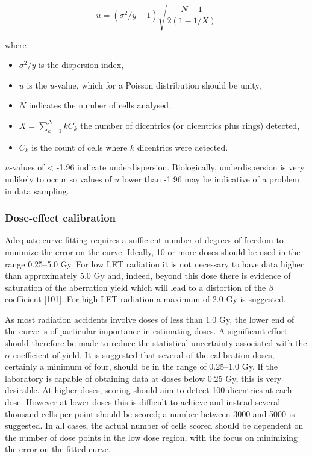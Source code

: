 \documentclass[]{scrartcl}
\providecommand{\tightlist}{%
  \setlength{\itemsep}{0pt}\setlength{\parskip}{0pt}}
\begin{document}
\begin{equation} 
  u = (\sigma^{2}/\bar{y} - 1) \sqrt{\frac{N - 1}{2 (1 - 1/X)}}
  \label{eq:u-value}
\end{equation}

where

\begin{itemize}
\tightlist
\item
  \(\sigma^{2}/\bar{y}\) is the dispersion index,
\item
  \(u\) is the \(u\)-value, which for a Poisson distribution should be unity,
\item
  \(N\) indicates the number of cells analysed,
\item
  \(X = \sum_{k=1}^{N} k C_{k}\) the number of dicentrics (or dicentrics plus rings) detected,
\item
  \(C_{k}\) is the count of cells where \(k\) dicentrics were detected.
\end{itemize}

\(u\)-values of \textless{} -1.96 indicate underdispersion. Biologically, underdispersion is very unlikely to occur so values of \(u\) lower than -1.96 may be indicative of a problem in data sampling.

\hypertarget{dose-effect-calibration}{%
\subsubsection{Dose-effect calibration}\label{dose-effect-calibration}}

Adequate curve fitting requires a sufficient number of degrees of freedom to minimize the error on the curve. Ideally, 10 or more doses should be used in the range 0.25--5.0 Gy. For low LET radiation it is not necessary to have data higher than approximately 5.0 Gy and, indeed, beyond this dose there is evidence of saturation of the aberration yield which will lead to a distortion of the \(\beta\) coefficient {[}101{]}. For high LET radiation a maximum of 2.0 Gy is suggested.

As most radiation accidents involve doses of less than 1.0 Gy, the lower end of the curve is of particular importance in estimating doses. A significant effort should therefore be made to reduce the statistical uncertainty associated with the \(\alpha\) coefficient of yield. It is suggested that several of the calibration doses, certainly a minimum of four, should be in the range of 0.25--1.0 Gy. If the laboratory is capable of obtaining data at doses below 0.25 Gy, this is very desirable. At higher doses, scoring should aim to detect 100 dicentrics at each dose. However at lower doses this is difficult to achieve and instead several thousand cells per point should be scored; a number between 3000 and 5000 is suggested. In all cases, the actual number of cells scored should be dependent on the number of dose points in the low dose region, with the focus on minimizing the error on the fitted curve.
\end{document}
